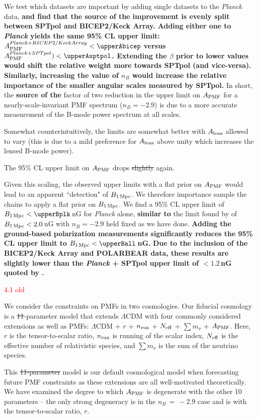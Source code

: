 \documentclass{article}
\newcommand{\apmf}{\ensuremath{A_{\rm PMF}}}
\newcommand{\bpmf}{\ensuremath{B_{\rm 1\,Mpc}}}
\newcommand{\alens}{\ensuremath{A_{\rm lens}}}
\newcommand{\lcdm}{\ensuremath{\Lambda}CDM}
\newcommand{\nrun}{\ensuremath{n_{\rm run}}}
\newcommand{\neff}{\ensuremath{N_{\rm eff}}}
\newcommand{\mnu}{\ensuremath{\sum m_\nu}}
\newcommand{\planck}{{\sl Planck}}
\newcommand{\bicepkeck}{BICEP2/Keck Array}
\newcommand{\sptpol}{SPTpol}
\newcommand{\changed}[1]{\textcolor{Red}{#1}}
\newcommand{\removed}[1]{\st{#1}}
\newcommand{\added}[1]{\textbf{#1}}
\begin{document}
We test which datasets are important by adding single datasets to the \planck{} data, \added{and find that the source of the improvement is evenly split between \sptpol{} and \bicepkeck{}.
Adding either one to \planck{} yields the same 95\% CL upper limit: $\apmf^{\planck+\bicepkeck} <  \upperAbicep$ versus  $\apmf^{\planck+\sptpol}) < \upperAsptpol$. 
Extending the $\beta$ prior to lower values would shift the relative weight more towards \sptpol{} (and vice-versa). 
Similarly, increasing the value of $n_B$ would  increase the relative importance of the smaller angular scales measured by \sptpol.}
In short, the \added{source of the} factor of two reduction in the upper limit on \apmf{} for a nearly-scale-invariant PMF spectrum ($n_B=-2.9$) is due to a more accurate measurement of the B-mode power spectrum at all scales.

Somewhat counterintuitively, the limits are somewhat better with \alens{} allowed to vary (this is due to a mild preference for \alens{} above unity which increases the lensed B-mode power). 

The 95\% CL upper limit on \apmf{} drops \removed{slightly} again.

Given this scaling, the observed upper limits with a flat prior on \apmf{} would lead to an apparent ``detection" of \bpmf. 
We therefore importance sample the chains to apply a flat prior on \bpmf. 
We find a 95\% CL upper limit of $\bpmf < \upperBplk$\,nG for \planck{} alone,
\added{similar to} the limit found by \citet{planck15-19} of $\bpmf < 2.0$\,nG with $n_B=-2.9$ held fixed as we have done. 
\added{Adding the ground-based polarization measurements significantly reduces the 95\% CL upper limit to $\bpmf < \upperBall$\,nG. }
\added{Due to the inclusion of the \bicepkeck{} and POLARBEAR data, these results are slightly lower than the \planck{} + \sptpol{} upper limit of $<1.2\,$nG quoted by \citet{zucca16}.}

\changed{4.1 old}

We consider the constraints on PMFs in two cosmologies. 
Our fiducial cosmology is a \removed{11}-parameter model that extends \lcdm{} with  four  commonly considered extensions as well as PMFs:  \lcdm{} +  $r$ + \nrun{} +  \neff{} + \mnu{} + \apmf. 
Here, $r$ is the tensor-to-scalar ratio, \nrun{} is running of the scalar index, \neff{} is the effective number of relativistic species, and \mnu{} is the sum of the neutrino species. 

This \removed{11-parameter} model is our default cosmological model when forecasting future PMF constraints as these extensions are all well-motivated theoretically. 
We have examined the degree to which \apmf{} is degenerate with the other 10 parameters -- the only strong degeneracy is in the $n_B\,=\,-2.9$ case and is with the tensor-to-scalar ratio, $r$. 
\end{document}
